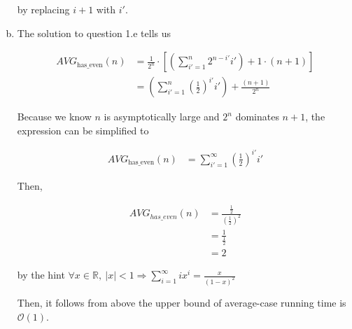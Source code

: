 \documentclass[12pt]{article}
\begin{document}
\begin{enumerate}[a.]
\begin{mdframed}
        by replacing $i + 1$ with $i'$.

        \color{black}

    \end{mdframed}

    \item

    The solution to question 1.e tells us

    \setcounter{equation}{0}
    \begin{align}
        AVG_{\text{has\_even}}(n) &= \frac{1}{2^n} \cdot \left[ \left(\sum\limits_{i'=1}^n 2^{n-i'} i' \right) +  1 \cdot (n+1) \right]\\
        &= \left(\sum\limits_{i'=1}^n \left( \frac{1}{2} \right)^{i'} i' \right) +  \frac{(n+1)}{2^n}
    \end{align}

    \bigskip

    Because we know $n$ is asymptotically large and $2^n$ dominates $n+1$, the
    expression can be simplified to

    \begin{align}
        AVG_{\text{has\_even}}(n) &= \sum\limits_{i'=1}^{\infty} \left( \frac{1}{2} \right)^{i'} i'
    \end{align}

    \bigskip

    Then,

    \begin{align}
        AVG_{has\_even}(n) &= \frac{\frac{1}{2}}{\left( \frac{1}{2} \right)^2}\\
        &= \frac{1}{\frac{1}{2}}\\
        &= 2
    \end{align}

    by the hint $ \forall x \in \mathbb{R},\:\lvert x \rvert < 1 \Rightarrow
    \sum\limits_{i=1}^{\infty} ix^i = \frac{x}{(1-x)^2}$

    \bigskip

    Then, it follows from above the upper bound of average-case running time is
    $\mathcal{O}(1)$.

\end{enumerate}
\end{document}
